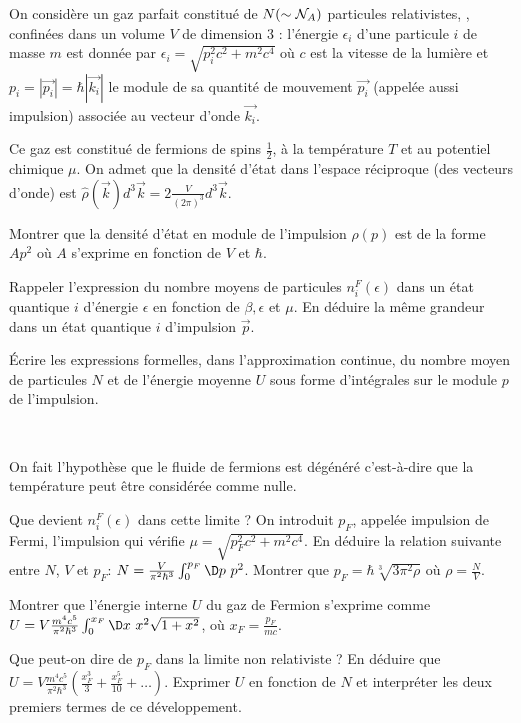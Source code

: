 
On considère un gaz parfait constitué de $N (\sim {\cal N}_A)$ particules relativistes, , confinées dans un volume $V$ de dimension 3 : l'énergie  $\epsilon_i$ d'une particule $i$ de masse $m$ est donnée par $\epsilon_i= \sqrt{p_i^2c^2+m^2c^4}$ où $c$ est la vitesse de la lumière et $p_i=|\Vec{p_i}|=\hbar |\Vec{k_i}|$ le module de sa quantité de mouvement $\Vec{p_i}$ (appelée aussi impulsion) associée au vecteur d'onde $\Vec{k_i}$.  

Ce gaz est constitué de fermions de spins $\frac{1}{2}$, à la température $T$ et au potentiel chimique $\mu$. On admet que la densité d'état dans l'espace réciproque (des vecteurs d'onde) est $\hat{\rho}(\Vec{k})d^3\Vec{k}=2 \frac{V}{(2 \pi)^3} d^3 \Vec{k}$.

\question Montrer que la densité d'état en module de l'impulsion $\rho(p)$ est de la forme $A p^2$ où $A$ s'exprime en fonction de $V$ et $\hbar$. 

\question Rappeler l'expression du nombre moyens de particules $n_i^F(\epsilon)$ dans un état quantique $i$ d'énergie $\epsilon$ en fonction de $\beta, \epsilon$ et $\mu$. En déduire la même grandeur dans un état quantique $i$ d'impulsion $\Vec{p}$.

\question \'Ecrire les expressions formelles, dans l'approximation continue,   du nombre moyen de particules $N$ et de l'énergie moyenne $U$ sous forme d'intégrales sur le module $p$ de l'impulsion.

\ 

On fait l'hypothèse que le fluide de fermions est dégénéré c'est-à-dire que la température peut être considérée comme nulle.

\question Que devient $n_i^F(\epsilon)$ dans cette limite ? On introduit $p_F$, appelée impulsion de Fermi, l'impulsion qui vérifie $\mu=\sqrt{p_F^2c^2+m^2c^4}$.  En déduire la relation suivante entre $N$, $V$ et  $p_F$: $N= \frac{V}{\pi^2 \hbar^3}\int_0^{p_F} \D p \ p^2 $. Montrer que $p_F=\hbar \sqrt[3]{3 \pi^2\rho}$ où $\rho=\frac{N}{V}$.

\question Montrer que l'énergie interne $U$ du gaz de Fermion s'exprime comme $U=V\frac{m^4c^5}{\pi^2 \hbar^3}\int_0^{x_F} \D x \ x^2 \sqrt{1+x^2}$, où $x_F=\frac{p_F}{mc}$.

\question Que peut-on dire de $p_F$ dans la limite non relativiste ? En déduire que $U=V\frac{m^4c^5}{\pi^2 \hbar^3}(\frac{x_F^3}{3}+\frac{x_F^5}{10}+\ldots)$. Exprimer $U$ en fonction de $N$ et interpréter les deux premiers termes de ce développement. 

